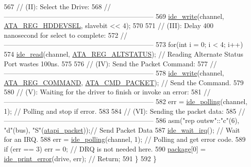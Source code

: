 \begin{DoxyCode}
567       \textcolor{comment}{// (II): Select the Drive:}
568       \textcolor{comment}{// ------------------------------------------------------------------}
569       \hyperlink{a00023_afdb22c37a32d86fcb64e55b3edab4790_afdb22c37a32d86fcb64e55b3edab4790}{ide\_write}(channel, \hyperlink{a00023_af80b9f0d852148eda227b433f72ca8bb_af80b9f0d852148eda227b433f72ca8bb}{ATA\_REG\_HDDEVSEL}, slavebit << 4);
570  
571       \textcolor{comment}{// (III): Delay 400 nanosecond for select to complete:}
572       \textcolor{comment}{// ------------------------------------------------------------------}
573       \textcolor{keywordflow}{for}(\textcolor{keywordtype}{int} i = 0; i < 4; i++)
574          \hyperlink{a00023_aef734da4bdc0c1d014528fd2f66e0686_aef734da4bdc0c1d014528fd2f66e0686}{ide\_read}(channel, \hyperlink{a00023_a051769d4520d201d24bbb06758a5c1de_a051769d4520d201d24bbb06758a5c1de}{ATA\_REG\_ALTSTATUS}); \textcolor{comment}{// Reading Alternate Status Port
       wastes 100ns.}
575  
576       \textcolor{comment}{// (IV): Send the Packet Command:}
577       \textcolor{comment}{// ------------------------------------------------------------------}
578       \hyperlink{a00023_afdb22c37a32d86fcb64e55b3edab4790_afdb22c37a32d86fcb64e55b3edab4790}{ide\_write}(channel, \hyperlink{a00023_a1a54069e05845badff84e1490ca4681e_a1a54069e05845badff84e1490ca4681e}{ATA\_REG\_COMMAND}, \hyperlink{a00023_afaaead63f9b69425b9f6514b03f0bbb2_afaaead63f9b69425b9f6514b03f0bbb2}{ATA\_CMD\_PACKET});      \textcolor{comment}{//
       Send the Command.}
579  
580       \textcolor{comment}{// (V): Waiting for the driver to finish or invoke an error:}
581       \textcolor{comment}{// ------------------------------------------------------------------}
582       err = \hyperlink{a00023_a03e85b94d6fbfb957e1b88c3dd064eca_a03e85b94d6fbfb957e1b88c3dd064eca}{ide\_polling}(channel, 1);            \textcolor{comment}{// Polling and stop if error.}
583  
584       \textcolor{comment}{// (VI): Sending the packet data:}
585       \textcolor{comment}{// ------------------------------------------------------------------}
586         \textcolor{keyword}{asm}(\textcolor{stringliteral}{"rep   outsw"}::\textcolor{stringliteral}{"c"}(6), \textcolor{stringliteral}{"d"}(bus), \textcolor{stringliteral}{"S"}(\hyperlink{a00023_a02351861ecf3191d5dbbcc1910b7c109_a02351861ecf3191d5dbbcc1910b7c109}{atapi\_packet}));\textcolor{comment}{// Send Packet Data}
587         \hyperlink{a00023_a31655fcec0cc8f9f8792b98cd4441fdf_a31655fcec0cc8f9f8792b98cd4441fdf}{ide\_wait\_irq}();                  \textcolor{comment}{// Wait for an IRQ.}
588         err = \hyperlink{a00023_a03e85b94d6fbfb957e1b88c3dd064eca_a03e85b94d6fbfb957e1b88c3dd064eca}{ide\_polling}(channel, 1);            \textcolor{comment}{// Polling and get error code.}
589         \textcolor{keywordflow}{if} (err == 3) err = 0; \textcolor{comment}{// DRQ is not needed here.}
590       \hyperlink{a00026_a820b2230ab700e13350794494bd4a60f_a820b2230ab700e13350794494bd4a60f}{package}[0] = \hyperlink{a00023_af7757307613c29c9bcbf0f8f5b2feee5_af7757307613c29c9bcbf0f8f5b2feee5}{ide\_print\_error}(drive, err); \textcolor{comment}{// Return;}
591    \}
592 \}
\end{DoxyCode}
